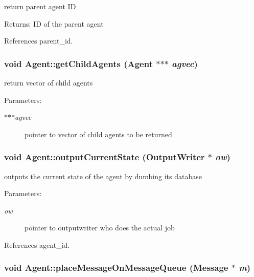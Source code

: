 return parent agent ID \begin{Desc}
\item[Returns:]ID of the parent agent \end{Desc}


References parent\_\-id.
\subsubsection[getChildAgents]{\setlength{\rightskip}{0pt plus 5cm}void Agent::getChildAgents ({\bf Agent} $\ast$$\ast$$\ast$ {\em agvec})}\label{classAgent_de8476b1dd68ece2a73f7a5159e26b3c}


return vector of child agents \begin{Desc}
\item[Parameters:]
\begin{description}
\item[{\em $\ast$$\ast$$\ast$agvec}]pointer to vector of child agents to be returned \end{description}
\end{Desc}
\subsubsection[outputCurrentState]{\setlength{\rightskip}{0pt plus 5cm}void Agent::outputCurrentState ({\bf OutputWriter} $\ast$ {\em ow})}\label{classAgent_6904cc83add9827300b9830e45239abc}


outputs the current state of the agent by dumbing its database \begin{Desc}
\item[Parameters:]
\begin{description}
\item[{\em ow}]pointer to outputwriter who does the actual job \end{description}
\end{Desc}


References agent\_\-id.
\subsubsection[placeMessageOnMessageQueue]{\setlength{\rightskip}{0pt plus 5cm}void Agent::placeMessageOnMessageQueue ({\bf Message} $\ast$ {\em m})\hspace{0.3cm}{\tt  [inline]}}\label{classAgent_9d17bfdb9a716179086aac20d41b6048}




